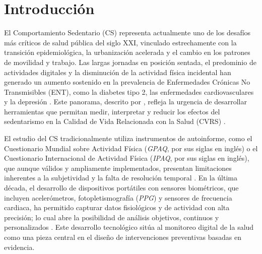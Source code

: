% 

\chapter{Introducción}
\label{cap:introduccion}

%

\noindent El Comportamiento Sedentario (CS) representa actualmente uno de los desafíos más críticos de salud pública del siglo XXI, vinculado estrechamente con la transición epidemiológica, la urbanización acelerada y el cambio en los patrones de movilidad y trabajo. Las largas jornadas en posición sentada, el predominio de actividades digitales y la disminución de la actividad física incidental han generado un aumento sostenido en la prevalencia de Enfermedades Crónicas No Transmisibles (ENT), como la diabetes tipo 2, las enfermedades cardiovasculares y la depresión \cite{Bull2020}. Este panorama, descrito por \cite{WHO2020}, refleja la urgencia de desarrollar herramientas que permitan medir, interpretar y reducir los efectos del sedentarismo en la Calidad de Vida Relacionada con la Salud (CVRS) \cite{Guthold2020}.

El estudio del CS tradicionalmente utiliza instrumentos de autoinforme, como el Cuestionario Mundial sobre Actividad Física (\textit{GPAQ}, por sus siglas en inglés) o el Cuestionario Internacional de Actividad Física (\textit{IPAQ}, por sus siglas en inglés), que aunque válidos y ampliamente implementados, presentan limitaciones inherentes a la subjetividad y la falta de resolución temporal \cite{Romero2022}. En la última década, el desarrollo de dispositivos portátiles con sensores biométricos, que incluyen acelerómetros, fotopletismografía (\textit{PPG}) y sensores de frecuencia cardiaca, ha permitido capturar datos fisiológicos y de actividad con alta precisión; lo cual abre la posibilidad de análisis objetivos, continuos y personalizados \cite{Henriksen2018,White2019,Strain2020}. Este desarrollo tecnológico sitúa al monitoreo digital de la salud como una pieza central en el diseño de intervenciones preventivas basadas en evidencia.

